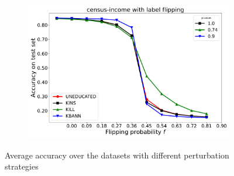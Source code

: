 \begin{figure}
\begin{subfigure}{\cellsize}
		\includegraphics[width=\linewidth]{figures/label_flip/census-income/uneducated-kins-kill-kbann-accuracy-average-curves}
	\end{subfigure}
	\caption{Average accuracy over the datasets with different perturbation strategies}
	\label{fig:accuracy-results}
\end{figure}